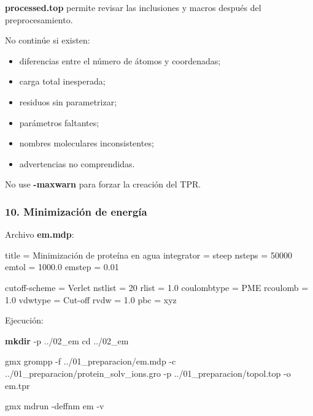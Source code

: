 \documentclass[
  spanish,
  11pt,
  a4paper]{article}
\newenvironment{Shaded}{\begin{snugshade}}{\end{snugshade}}
\newcommand{\AttributeTok}[1]{\textcolor[rgb]{0.13,0.29,0.53}{#1}}
\newcommand{\BuiltInTok}[1]{#1}
\newcommand{\DataTypeTok}[1]{\textcolor[rgb]{0.13,0.29,0.53}{#1}}
\newcommand{\DecValTok}[1]{\textcolor[rgb]{0.00,0.00,0.81}{#1}}
\newcommand{\ExtensionTok}[1]{#1}
\newcommand{\FloatTok}[1]{\textcolor[rgb]{0.00,0.00,0.81}{#1}}
\newcommand{\FunctionTok}[1]{\textcolor[rgb]{0.13,0.29,0.53}{\textbf{#1}}}
\newcommand{\NormalTok}[1]{#1}
\newcommand{\OtherTok}[1]{\textcolor[rgb]{0.56,0.35,0.01}{#1}}
\newcommand{\StringTok}[1]{\textcolor[rgb]{0.31,0.60,0.02}{#1}}
\providecommand{\tightlist}{%
  \setlength{\itemsep}{0pt}\setlength{\parskip}{0pt}}
\begin{document}
\textbf{processed.top} permite revisar las inclusiones y macros después
del preprocesamiento.

No continúe si existen:

\begin{itemize}
\tightlist
\item
  diferencias entre el número de átomos y coordenadas;
\item
  carga total inesperada;
\item
  residuos sin parametrizar;
\item
  parámetros faltantes;
\item
  nombres moleculares inconsistentes;
\item
  advertencias no comprendidas.
\end{itemize}

No use \textbf{-maxwarn} para forzar la creación del TPR.

\subsubsection{10. Minimización de
energía}\label{minimizaciuxf3n-de-energuxeda-1}

Archivo \textbf{em.mdp}:

\begin{Shaded}
\begin{Highlighting}[]
\DataTypeTok{title            }\OtherTok{=}\StringTok{ Minimización de proteína en agua}
\DataTypeTok{integrator       }\OtherTok{=}\StringTok{ steep}
\DataTypeTok{nsteps           }\OtherTok{=}\StringTok{ }\DecValTok{50000}
\DataTypeTok{emtol            }\OtherTok{=}\StringTok{ }\FloatTok{1000.0}
\DataTypeTok{emstep           }\OtherTok{=}\StringTok{ }\FloatTok{0.01}

\DataTypeTok{cutoff{-}scheme    }\OtherTok{=}\StringTok{ Verlet}
\DataTypeTok{nstlist          }\OtherTok{=}\StringTok{ }\DecValTok{20}
\DataTypeTok{rlist            }\OtherTok{=}\StringTok{ }\FloatTok{1.0}
\DataTypeTok{coulombtype      }\OtherTok{=}\StringTok{ PME}
\DataTypeTok{rcoulomb         }\OtherTok{=}\StringTok{ }\FloatTok{1.0}
\DataTypeTok{vdwtype          }\OtherTok{=}\StringTok{ Cut{-}off}
\DataTypeTok{rvdw             }\OtherTok{=}\StringTok{ }\FloatTok{1.0}
\DataTypeTok{pbc              }\OtherTok{=}\StringTok{ xyz}
\end{Highlighting}
\end{Shaded}

Ejecución:

\begin{Shaded}
\begin{Highlighting}[]
\FunctionTok{mkdir} \AttributeTok{{-}p}\NormalTok{ ../02\_em}
\BuiltInTok{cd}\NormalTok{ ../02\_em}

\ExtensionTok{gmx}\NormalTok{ grompp     }\AttributeTok{{-}f}\NormalTok{ ../01\_preparacion/em.mdp     }\AttributeTok{{-}c}\NormalTok{ ../01\_preparacion/protein\_solv\_ions.gro     }\AttributeTok{{-}p}\NormalTok{ ../01\_preparacion/topol.top     }\AttributeTok{{-}o}\NormalTok{ em.tpr}

\ExtensionTok{gmx}\NormalTok{ mdrun }\AttributeTok{{-}deffnm}\NormalTok{ em }\AttributeTok{{-}v}
\end{Highlighting}
\end{Shaded}
\end{document}
